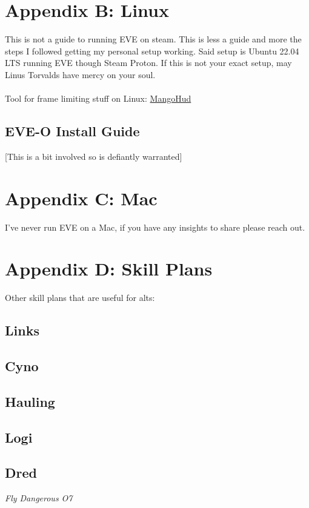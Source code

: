 \documentclass{article}
\begin{document}
\section*{Appendix B: Linux}
This is not a guide to running EVE on steam. This is less a guide and more the steps I followed getting my personal setup working. Said setup is 
Ubuntu 22.04 LTS running EVE though Steam Proton. If this is not your exact setup, may Linus Torvalds have mercy on your soul.
\\
\\
Tool for frame limiting stuff on Linux: \href{https://github.com/flightlessmango/MangoHud}{MangoHud}

\subsection*{EVE-O Install Guide}
[This is a bit involved so is defiantly warranted]

\section*{Appendix C: Mac}
I've never run EVE on a Mac, if you have any insights to share please reach out.

\section*{Appendix D: Skill Plans}
Other skill plans that are useful for alts:

\subsection*{Links}
\subsection*{Cyno}
\subsection*{Hauling}
\subsection*{Logi}
\subsection*{Dred}





\clearpage
\begin{center}
  \vspace*{\fill}
  \textsl{\large \ttfamily Fly Dangerous O7}
  \vspace*{\fill}
\end{center}
\end{document}
